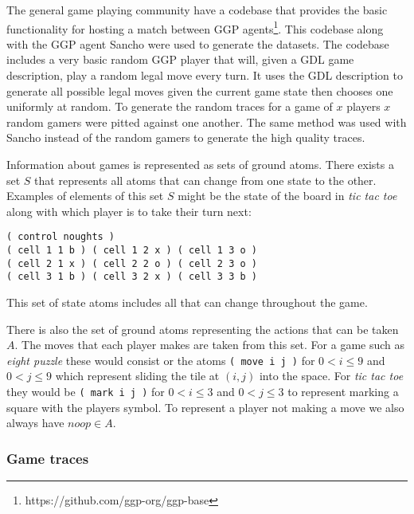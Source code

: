 The general game playing community have a codebase that provides the basic functionality for hosting a match between GGP agents\footnote{https://github.com/ggp-org/ggp-base}. This codebase along with the GGP agent Sancho were used to generate the datasets. The codebase includes a very basic random GGP player that will, given a GDL game description, play a random legal move every turn. It uses the GDL description to generate all possible legal moves given the current game state then chooses one uniformly at random. To generate the random traces for a game of $x$ players $x$ random gamers were pitted against one another. The same method was used with Sancho instead of the random gamers to generate the high quality traces.

Information about games is represented as sets of ground atoms. There exists a set $S$ that represents all atoms that can change from one state to the other. Examples of elements of this set $S$ might be the state of the board in \textit{tic tac toe} along with which player is to take their turn next:
\begin{verbatim}
( control noughts )
( cell 1 1 b ) ( cell 1 2 x ) ( cell 1 3 o )
( cell 2 1 x ) ( cell 2 2 o ) ( cell 2 3 o )
( cell 3 1 b ) ( cell 3 2 x ) ( cell 3 3 b )
\end{verbatim}
This set of state atoms includes all that can change throughout the game.

There is also the set of ground atoms representing the actions that can be taken $A$. The moves that each player makes are taken from this set. For a game such as \textit{eight puzzle} these would consist or the atoms \verb|( move i j )| for $0<i\leq 9$ and $0<j\leq 9$ which represent sliding the tile at $(i,j)$ into the space. For \textit{tic tac toe} they would be \verb|( mark i j )| for $0<i\leq 3$ and $0<j\leq 3$ to represent marking a square with the players symbol. To represent a player not making a move we also always have $noop \in A$.

\subsubsection{Game traces}

